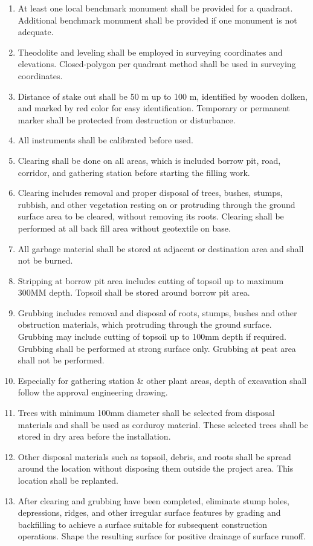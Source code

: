 \documentclass{article}%
\begin{document}
\begin{enumerate}[label=\alph*),start=1]
\item%
At least one local benchmark monument shall be provided for a quadrant. Additional benchmark monument shall be provided if one monument is not adequate.%
\item%
Theodolite and leveling shall be employed in surveying coordinates and elevations. Closed{-}polygon per quadrant method shall be used in surveying coordinates.%
\item%
Distance of stake out shall be 50 m up to 100 m, identified by wooden dolken, and marked by red color for easy identification. Temporary or permanent marker shall be protected from destruction or disturbance.%
\item%
All instruments shall be calibrated before used.%
\item%
Clearing shall be done on all areas, which is included borrow pit, road, corridor, and gathering station before starting the filling work.%
\item%
Clearing includes removal and proper disposal of trees, bushes, stumps, rubbish, and other vegetation resting on or protruding through the ground surface area to be cleared, without removing its roots. Clearing shall be performed at all back fill area without geotextile on base.%
\item%
All garbage material shall be stored at adjacent or destination area and shall not be burned.%
\item%
Stripping at borrow pit area includes cutting of topsoil up to maximum 300MM depth. Topsoil shall be stored around borrow pit area.%
\item%
Grubbing includes removal and disposal of roots, stumps, bushes and other obstruction materials, which protruding through the ground surface. Grubbing may include cutting of topsoil up to 100mm depth if required. Grubbing shall be performed at strong surface only. Grubbing at peat area shall not be performed.%
\item%
Especially for gathering station \& other plant areas, depth of excavation shall follow the approval engineering drawing.%
\item%
Trees with minimum 100mm diameter shall be selected from disposal materials and shall be used as corduroy material. These selected trees shall be stored in dry area before the installation.%
\item%
Other disposal materials such as topsoil, debris, and roots shall be spread around the location without disposing them outside the project area. This location shall be replanted.%
\item%
After clearing and grubbing have been completed, eliminate stump holes, depressions, ridges, and other irregular surface features by grading and backfilling to achieve a surface suitable for subsequent construction operations. Shape the resulting surface for positive drainage of surface runoff.%
\end{enumerate}
\end{document}

